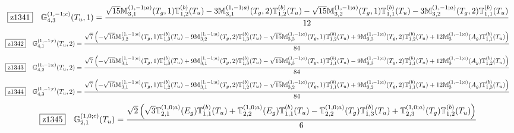 \documentclass[fleqn,10pt,landscape]{jsarticle}
\begin{document}
\begin{dmath*}
\hspace*{3mm}\fbox{z1341}\quad \mathbb{G}_{4,3}^{(1,-1;c)}(T_{u},1)=\frac{\sqrt{15} \mathbb{M}_{3,1}^{(1,-1;a)}(T_{g},1) \mathbb{T}_{1,2}^{(b)}(T_{u}) - 3 \mathbb{M}_{3,1}^{(1,-1;a)}(T_{g},2) \mathbb{T}_{1,2}^{(b)}(T_{u}) - \sqrt{15} \mathbb{M}_{3,2}^{(1,-1;a)}(T_{g},1) \mathbb{T}_{1,1}^{(b)}(T_{u}) - 3 \mathbb{M}_{3,2}^{(1,-1;a)}(T_{g},2) \mathbb{T}_{1,1}^{(b)}(T_{u})}{12}
\end{dmath*}
\begin{dmath*}
\hspace*{3mm}\fbox{z1342}\quad \mathbb{G}_{4,1}^{(1,-1;c)}(T_{u},2)=\frac{\sqrt{7} \left(- \sqrt{15} \mathbb{M}_{3,2}^{(1,-1;a)}(T_{g},1) \mathbb{T}_{1,3}^{(b)}(T_{u}) - 9 \mathbb{M}_{3,2}^{(1,-1;a)}(T_{g},2) \mathbb{T}_{1,3}^{(b)}(T_{u}) - \sqrt{15} \mathbb{M}_{3,3}^{(1,-1;a)}(T_{g},1) \mathbb{T}_{1,2}^{(b)}(T_{u}) + 9 \mathbb{M}_{3,3}^{(1,-1;a)}(T_{g},2) \mathbb{T}_{1,2}^{(b)}(T_{u}) + 12 \mathbb{M}_{3}^{(1,-1;a)}(A_{g}) \mathbb{T}_{1,1}^{(b)}(T_{u})\right)}{84}
\end{dmath*}
\begin{dmath*}
\hspace*{3mm}\fbox{z1343}\quad \mathbb{G}_{4,2}^{(1,-1;c)}(T_{u},2)=\frac{\sqrt{7} \left(- \sqrt{15} \mathbb{M}_{3,1}^{(1,-1;a)}(T_{g},1) \mathbb{T}_{1,3}^{(b)}(T_{u}) + 9 \mathbb{M}_{3,1}^{(1,-1;a)}(T_{g},2) \mathbb{T}_{1,3}^{(b)}(T_{u}) - \sqrt{15} \mathbb{M}_{3,3}^{(1,-1;a)}(T_{g},1) \mathbb{T}_{1,1}^{(b)}(T_{u}) - 9 \mathbb{M}_{3,3}^{(1,-1;a)}(T_{g},2) \mathbb{T}_{1,1}^{(b)}(T_{u}) + 12 \mathbb{M}_{3}^{(1,-1;a)}(A_{g}) \mathbb{T}_{1,2}^{(b)}(T_{u})\right)}{84}
\end{dmath*}
\begin{dmath*}
\hspace*{3mm}\fbox{z1344}\quad \mathbb{G}_{4,3}^{(1,-1;c)}(T_{u},2)=\frac{\sqrt{7} \left(- \sqrt{15} \mathbb{M}_{3,1}^{(1,-1;a)}(T_{g},1) \mathbb{T}_{1,2}^{(b)}(T_{u}) - 9 \mathbb{M}_{3,1}^{(1,-1;a)}(T_{g},2) \mathbb{T}_{1,2}^{(b)}(T_{u}) - \sqrt{15} \mathbb{M}_{3,2}^{(1,-1;a)}(T_{g},1) \mathbb{T}_{1,1}^{(b)}(T_{u}) + 9 \mathbb{M}_{3,2}^{(1,-1;a)}(T_{g},2) \mathbb{T}_{1,1}^{(b)}(T_{u}) + 12 \mathbb{M}_{3}^{(1,-1;a)}(A_{g}) \mathbb{T}_{1,3}^{(b)}(T_{u})\right)}{84}
\end{dmath*}
\begin{dmath*}
\hspace*{3mm}\fbox{z1345}\quad \mathbb{G}_{2,1}^{(1,0;c)}(T_{u})=\frac{\sqrt{2} \left(\sqrt{3} \mathbb{T}_{2,1}^{(1,0;a)}(E_{g}) \mathbb{T}_{1,1}^{(b)}(T_{u}) + \mathbb{T}_{2,2}^{(1,0;a)}(E_{g}) \mathbb{T}_{1,1}^{(b)}(T_{u}) - \mathbb{T}_{2,2}^{(1,0;a)}(T_{g}) \mathbb{T}_{1,3}^{(b)}(T_{u}) + \mathbb{T}_{2,3}^{(1,0;a)}(T_{g}) \mathbb{T}_{1,2}^{(b)}(T_{u})\right)}{6}
\end{dmath*}
\end{document}
